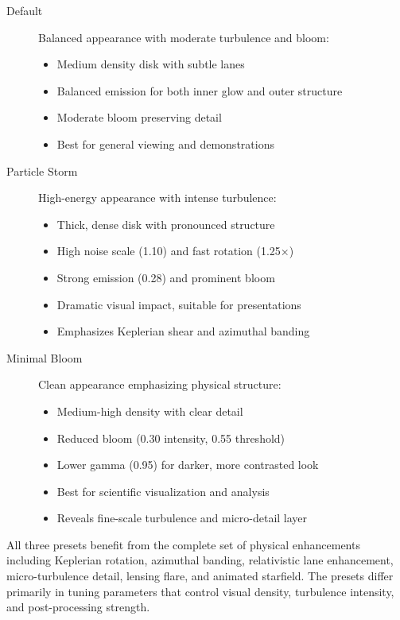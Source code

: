 \documentclass[12pt,a4paper]{article}
\theoremstyle{definition}
\theoremstyle{remark}
\begin{document}
\begin{description}
    \item[Default] Balanced appearance with moderate turbulence and bloom:
        \begin{itemize}
            \item Medium density disk with subtle lanes
            \item Balanced emission for both inner glow and outer structure
            \item Moderate bloom preserving detail
            \item Best for general viewing and demonstrations
        \end{itemize}
    
    \item[Particle Storm] High-energy appearance with intense turbulence:
        \begin{itemize}
            \item Thick, dense disk with pronounced structure
            \item High noise scale (1.10) and fast rotation (1.25×)
            \item Strong emission (0.28) and prominent bloom
            \item Dramatic visual impact, suitable for presentations
            \item Emphasizes Keplerian shear and azimuthal banding
        \end{itemize}
    
    \item[Minimal Bloom] Clean appearance emphasizing physical structure:
        \begin{itemize}
            \item Medium-high density with clear detail
            \item Reduced bloom (0.30 intensity, 0.55 threshold)
            \item Lower gamma (0.95) for darker, more contrasted look
            \item Best for scientific visualization and analysis
            \item Reveals fine-scale turbulence and micro-detail layer
        \end{itemize}
\end{description}

All three presets benefit from the complete set of physical enhancements including Keplerian rotation, azimuthal banding, relativistic lane enhancement, micro-turbulence detail, lensing flare, and animated starfield. The presets differ primarily in tuning parameters that control visual density, turbulence intensity, and post-processing strength.
\end{document}
